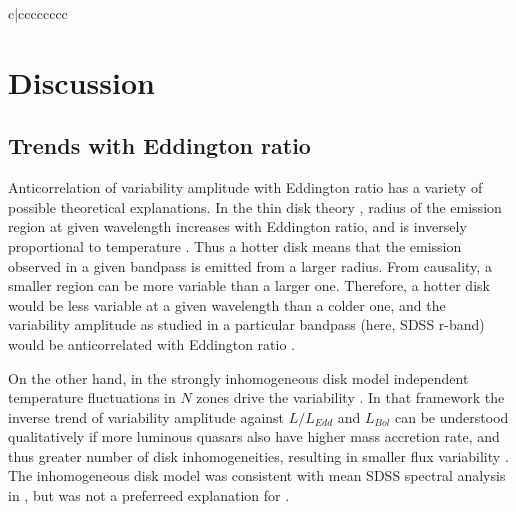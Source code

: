 \documentclass[twocolumn]{aastex62}
\begin{document}
\begin{deluxetable*}{c|cccccccc}
	\enddata
\end{deluxetable*}





\section{Discussion}
\label{sec:discussion}
\subsection{Trends with Eddington ratio}
Anticorrelation of  variability amplitude with Eddington ratio  has a variety of possible theoretical explanations. In the thin disk theory \citep{shakura1973, frank2002, netzer2013}, radius of the emission region at given wavelength increases with Eddington ratio, and is inversely proportional to temperature \citep{rakshit2017}. Thus a hotter disk means that the emission observed in a given bandpass is emitted from a larger radius. From causality, a smaller region can be more variable than a larger one. Therefore, a  hotter disk would be less variable at a given wavelength than a colder one, and  the variability amplitude as studied in a particular bandpass (here, SDSS r-band) would be anticorrelated with Eddington ratio \citep{fausnaugh2016,edelson2015}. 

On the other hand, in the strongly inhomogeneous disk model independent temperature fluctuations in $N$ zones drive the variability \citep{dexter2011}. In that framework the inverse trend of variability amplitude against $L/L_{Edd}$  and $L_{Bol}$  can be understood qualitatively if more luminous quasars also have higher mass accretion rate, and thus greater number of disk inhomogeneities, resulting in smaller flux variability \citep{simm2016}. The inhomogeneous disk model was consistent with mean SDSS spectral analysis in \citet{ruan2014}, but was not a preferreed explanation for \citet{kokubo2015}. 
\end{document}
